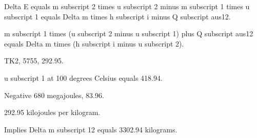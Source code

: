 Delta E equals m subscript 2 times u subscript 2 minus m subscript 1 times u subscript 1 equals Delta m times h subscript i minus Q subscript aus12.

m subscript 1 times (u subscript 2 minus u subscript 1) plus Q subscript aus12 equals Delta m times (h subscript i minus u subscript 2).

TK2, 5755, 292.95.

u subscript 1 at 100 degrees Celsius equals 418.94.

Negative 680 megajoules, 83.96.

292.95 kilojoules per kilogram.

Implies Delta m subscript 12 equals 3302.94 kilograms.